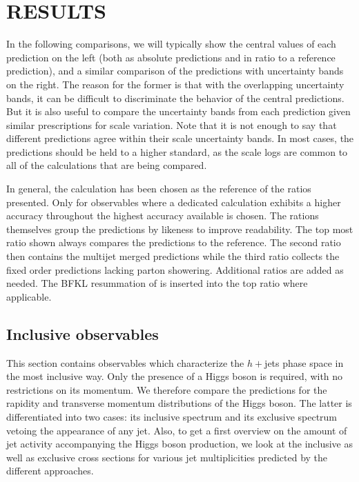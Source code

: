 \section{RESULTS}
\label{sec:hjetscomp:results}

In the following comparisons, we will typically show the central
values of each prediction on the left (both as absolute predictions
and in ratio to a reference prediction), and a similar comparison of
the predictions with uncertainty bands on the right. The reason for
the former is that with the overlapping uncertainty bands, it can be
difficult to discriminate the behavior of the central predictions. But
it is also useful to compare the uncertainty bands from each
prediction given similar prescriptions for scale variation.  Note that
it is not enough to say that different predictions agree within their
scale uncertainty bands. In most cases, the predictions should be held
to a higher standard, as the scale logs are common to all of the
calculations that are being compared.

In general, the \Powheg \NNLOPS calculation has been chosen as the 
reference of the ratios presented. Only for observables where a 
dedicated calculation exhibits a higher accuracy throughout the 
highest accuracy available is chosen. The rations themselves group 
the predictions by likeness to improve readability. The top most 
ratio shown always compares the \NNLOPS predictions to the reference. 
The second ratio then contains the multijet merged predictions while 
the third ratio collects the fixed order predictions lacking parton 
showering. Additional ratios are added as needed. The BFKL resummation 
of \Hej is inserted into the top ratio where applicable.



\subsection{Inclusive observables}
\label{sec:hjetscomp:results:inclobs}

This section contains observables which characterize the $h+{}$jets
phase space in the most inclusive way. Only the presence of a Higgs
boson is required, with no restrictions on its momentum. We therefore
compare the predictions for the rapidity and transverse momentum
distributions of the Higgs boson. The latter is differentiated into
two cases: its inclusive spectrum and its exclusive spectrum vetoing
the appearance of any jet. Also, to get a first overview on the amount
of jet activity accompanying the Higgs boson production, we look at
the inclusive as well as exclusive cross sections for various jet
multiplicities predicted by the different approaches.

